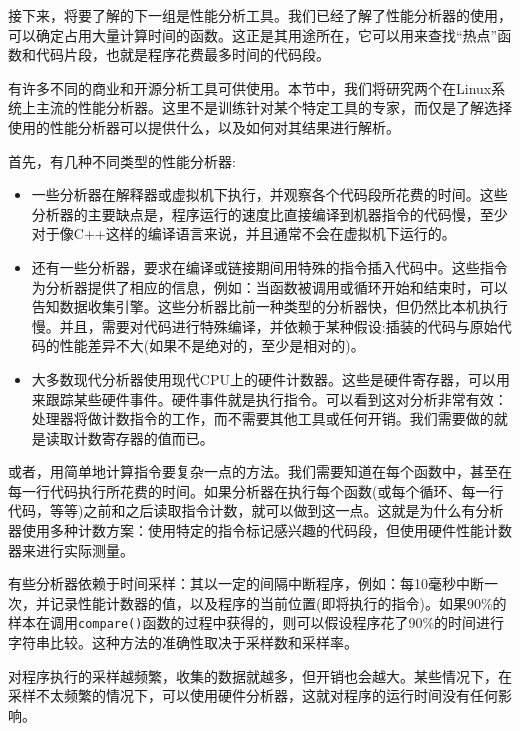
接下来，将要了解的下一组是性能分析工具。我们已经了解了性能分析器的使用，可以确定占用大量计算时间的函数。这正是其用途所在，它可以用来查找“热点”函数和代码片段，也就是程序花费最多时间的代码段。

有许多不同的商业和开源分析工具可供使用。本节中，我们将研究两个在Linux系统上主流的性能分析器。这里不是训练针对某个特定工具的专家，而仅是了解选择使用的性能分析器可以提供什么，以及如何对其结果进行解析。

首先，有几种不同类型的性能分析器:

\begin{itemize}
\item 一些分析器在解释器或虚拟机下执行，并观察各个代码段所花费的时间。这些分析器的主要缺点是，程序运行的速度比直接编译到机器指令的代码慢，至少对于像C++这样的编译语言来说，并且通常不会在虚拟机下运行的。

\item 还有一些分析器，要求在编译或链接期间用特殊的指令插入代码中。这些指令为分析器提供了相应的信息，例如：当函数被调用或循环开始和结束时，可以告知数据收集引擎。这些分析器比前一种类型的分析器快，但仍然比本机执行慢。并且，需要对代码进行特殊编译，并依赖于某种假设:插装的代码与原始代码的性能差异不大(如果不是绝对的，至少是相对的)。

\item 大多数现代分析器使用现代CPU上的硬件计数器。这些是硬件寄存器，可以用来跟踪某些硬件事件。硬件事件就是执行指令。可以看到这对分析非常有效：处理器将做计数指令的工作，而不需要其他工具或任何开销。我们需要做的就是读取计数寄存器的值而已。

\end{itemize}

或者，用简单地计算指令要复杂一点的方法。我们需要知道在每个函数中，甚至在每一行代码执行所花费的时间。如果分析器在执行每个函数(或每个循环、每一行代码，等等)之前和之后读取指令计数，就可以做到这一点。这就是为什么有分析器使用多种计数方案：使用特定的指令标记感兴趣的代码段，但使用硬件性能计数器来进行实际测量。

有些分析器依赖于时间采样：其以一定的间隔中断程序，例如：每10毫秒中断一次，并记录性能计数器的值，以及程序的当前位置(即将执行的指令)。如果90\%的样本在调用\texttt{compare()}函数的过程中获得的，则可以假设程序花了90\%的时间进行字符串比较。这种方法的准确性取决于采样数和采样率。

对程序执行的采样越频繁，收集的数据就越多，但开销也会越大。某些情况下，在采样不太频繁的情况下，可以使用硬件分析器，这就对程序的运行时间没有任何影响。



